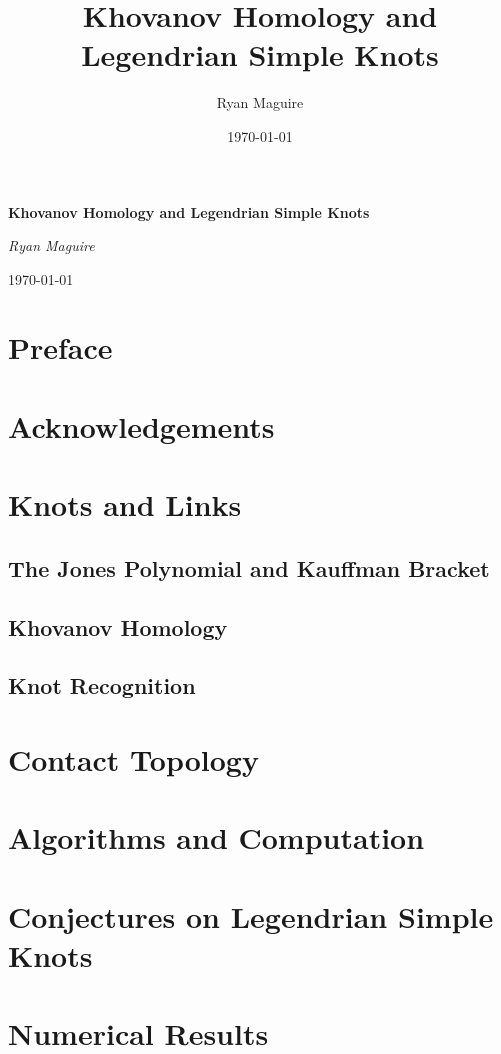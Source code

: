 \documentclass{book}
\title{Khovanov Homology and Legendrian Simple Knots}
\author{Ryan Maguire}
\date{\today}
\theoremstyle{plain}
\theoremstyle{normal}
\begin{document}
    \begin{titlepage}
        \centering
        \LARGE{\bfseries{Khovanov Homology and Legendrian Simple Knots}}
        \par\vspace{3.5cm}
        \par\vspace{4cm}
        \Large{\itshape{Ryan Maguire}}
        \par\vspace{1.5ex}
        \normalsize{\today}
    \end{titlepage}
    \nopagecolor
    \tableofcontents
    \listoffigures
    \listoftables
    \clearpage
    \chapter*{Preface}
    \clearpage
    \chapter*{Acknowledgements}
    \clearpage
    \chapter{Knots and Links}
        
        
        \section{The Jones Polynomial and Kauffman Bracket}
        \section{Khovanov Homology}
        \section{Knot Recognition}
    \chapter{Contact Topology}
    \chapter{Algorithms and Computation}
    \chapter{Conjectures on Legendrian Simple Knots}
    \chapter{Numerical Results}

    \clearpage
    \nocite{*}
    
    
\end{document}
